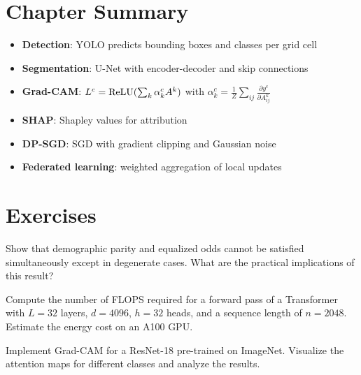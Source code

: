 \section{Chapter Summary}

\begin{keyformulas}
\begin{itemize}
\item \textbf{Detection}: YOLO predicts bounding boxes and classes per grid cell
\item \textbf{Segmentation}: U-Net with encoder-decoder and skip connections
\item \textbf{Grad-CAM}: $L^c = \mathrm{ReLU}(\sum_k \alpha_k^c A^k)$ with $\alpha_k^c = \frac{1}{Z}\sum_{ij}\frac{\partial y^c}{\partial A^k_{ij}}$
\item \textbf{SHAP}: Shapley values for attribution
\item \textbf{DP-SGD}: SGD with gradient clipping and Gaussian noise
\item \textbf{Federated learning}: weighted aggregation of local updates
\end{itemize}
\end{keyformulas}

\section{Exercises}

\begin{exercise}
Show that demographic parity and equalized odds cannot be satisfied simultaneously except in degenerate cases. What are the practical implications of this result?
\end{exercise}

\begin{exercise}
Compute the number of FLOPS required for a forward pass of a Transformer with $L=32$ layers, $d=4096$, $h=32$ heads, and a sequence length of $n=2048$. Estimate the energy cost on an A100 GPU.
\end{exercise}

\begin{exercise}
Implement Grad-CAM for a ResNet-18 pre-trained on ImageNet. Visualize the attention maps for different classes and analyze the results.
\end{exercise}

